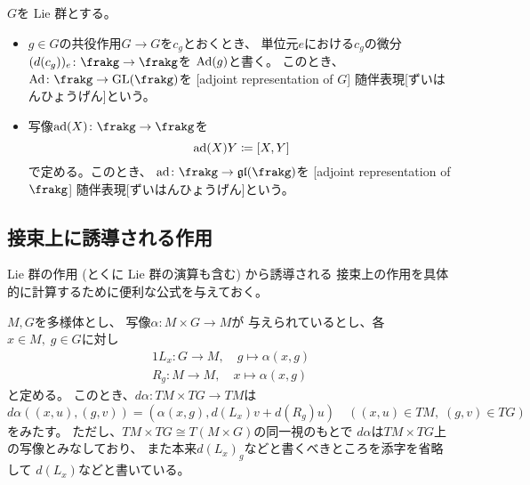 \documentclass[report]{jlreq}
\begin{document}

\begin{definition}[随伴表現]
    $G$を Lie 群とする。
    \begin{itemize}
        \item $g \in G$の共役作用$G \to G$を$c_g$とおくとき、
            単位元$e$における$c_g$の微分$(d(c_g))_e \colon \frakg \to \frakg$を
            $\operatorname{Ad}(g)$と書く。
            このとき、$\Ad \colon \frakg \to \GL(\frakg)$を
            [adjoint representation of $G$]
            {随伴表現}[ずいはんひょうげん]という。
        \item 写像$\ad(X) \colon \frakg \to \frakg$を
            \begin{equation}
                \operatorname{ad}(X)Y \coloneqq [X, Y]
            \end{equation}
            で定める。このとき、
            $\ad \colon \frakg \to \mathfrak{gl}(\frakg)$を
            [adjoint representation of $\frakg$]
            {随伴表現}[ずいはんひょうげん]という。
    \end{itemize}
\end{definition}


\subsection{接束上に誘導される作用}

Lie 群の作用 (とくに Lie 群の演算も含む) から誘導される
接束上の作用を具体的に計算するために便利な公式を与えておく。

\begin{lemma}
    $M, G$を多様体とし、
    {\smooth}写像$\alpha \colon M \times G \to M$が
    与えられているとし、各$x \in M, \; g \in G$に対し
    \begin{alignat}{1}
        L_x \colon G \to M, \quad g \mapsto \alpha(x, g) \\
        R_g \colon M \to M, \quad x \mapsto \alpha(x, g)
    \end{alignat}
    と定める。
    このとき、$d\alpha \colon TM \times TG \to TM$は
    \begin{equation}
        d\alpha((x, u), (g, v))
            = (\alpha(x, g), d(L_x) v + d(R_g) u)
            \quad
            ((x, u) \in TM, \; (g, v) \in TG)
    \end{equation}
    をみたす。
    ただし、$TM \times TG \cong T(M \times G)$の同一視のもとで
    $d\alpha$は$TM \times TG$上の写像とみなしており、
    また本来$d(L_x)_g$などと書くべきところを添字を省略して
    $d(L_x)$などと書いている。
\end{lemma}
\end{document}
